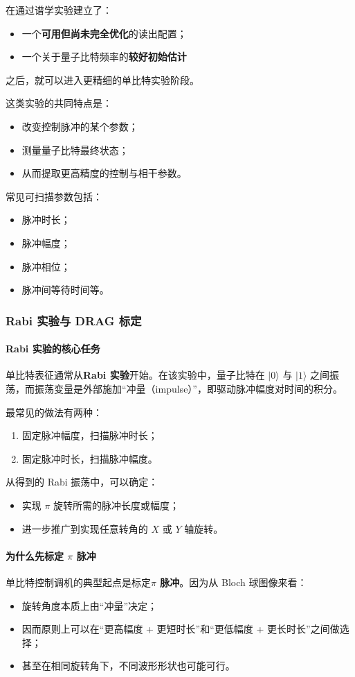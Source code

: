 \documentclass[12pt,a4paper,oneside]{ctexbook}
\begin{document}
在通过谱学实验建立了：
\begin{itemize}
    \item 一个\textbf{可用但尚未完全优化}的读出配置；
    \item 一个关于量子比特频率的\textbf{较好初始估计}
\end{itemize}
之后，就可以进入更精细的单比特实验阶段。

这类实验的共同特点是：
\begin{itemize}
    \item 改变控制脉冲的某个参数；
    \item 测量量子比特最终状态；
    \item 从而提取更高精度的控制与相干参数。
\end{itemize}

常见可扫描参数包括：
\begin{itemize}
    \item 脉冲时长；
    \item 脉冲幅度；
    \item 脉冲相位；
    \item 脉冲间等待时间等。
\end{itemize}

\subsubsection{Rabi 实验与 DRAG 标定}

\paragraph{Rabi 实验的核心任务}
单比特表征通常从\textbf{Rabi 实验}开始。在该实验中，量子比特在 \(|0\rangle\) 与 \(|1\rangle\) 之间振荡，而振荡变量是外部施加“冲量（impulse）”，即驱动脉冲幅度对时间的积分。

最常见的做法有两种：
\begin{enumerate}
    \item 固定脉冲幅度，扫描脉冲时长；
    \item 固定脉冲时长，扫描脉冲幅度。
\end{enumerate}

从得到的 Rabi 振荡中，可以确定：
\begin{itemize}
    \item 实现 \(\pi\) 旋转所需的脉冲长度或幅度；
    \item 进一步推广到实现任意转角的 \(X\) 或 \(Y\) 轴旋转。
\end{itemize}

\paragraph{为什么先标定 \(\pi\) 脉冲}
单比特控制调机的典型起点是标定\textbf{\(\pi\) 脉冲}。因为从 Bloch 球图像来看：
\begin{itemize}
    \item 旋转角度本质上由“冲量”决定；
    \item 因而原则上可以在“更高幅度 + 更短时长”和“更低幅度 + 更长时长”之间做选择；
    \item 甚至在相同旋转角下，不同波形形状也可能可行。
\end{itemize}
\end{document}

